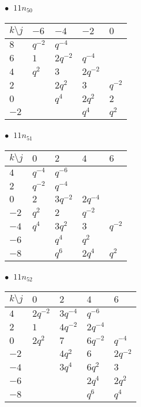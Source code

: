 %
\begin{minipage}{\linewidth}
$\bullet\ $ $11n_{50}$ \vspace{0.5em} \\
\begin{tabular}{l|llll}
$k \setminus j$ & $-6$ & $-4$ & $-2$ & $0$ \\
\hline
$8$ & $q^{-2}$ & $q^{-4}$ &  &  \\
$6$ & $1$ & $2q^{-2}$ & $q^{-4}$ &  \\
$4$ & $q^{2}$ & $3$ & $2q^{-2}$ &  \\
$2$ &  & $2q^{2}$ & $3$ & $q^{-2}$ \\
$0$ &  & $q^{4}$ & $2q^{2}$ & $2$ \\
$-2$ &  &  & $q^{4}$ & $q^{2}$ \\
\end{tabular}
\vspace{2em}
\end{minipage}
%
\begin{minipage}{\linewidth}
$\bullet\ $ $11n_{51}$ \vspace{0.5em} \\
\begin{tabular}{l|llll}
$k \setminus j$ & $0$ & $2$ & $4$ & $6$ \\
\hline
$4$ & $q^{-4}$ & $q^{-6}$ &  &  \\
$2$ & $q^{-2}$ & $q^{-4}$ &  &  \\
$0$ & $2$ & $3q^{-2}$ & $2q^{-4}$ &  \\
$-2$ & $q^{2}$ & $2$ & $q^{-2}$ &  \\
$-4$ & $q^{4}$ & $3q^{2}$ & $3$ & $q^{-2}$ \\
$-6$ &  & $q^{4}$ & $q^{2}$ &  \\
$-8$ &  & $q^{6}$ & $2q^{4}$ & $q^{2}$ \\
\end{tabular}
\vspace{2em}
\end{minipage}
%
\begin{minipage}{\linewidth}
$\bullet\ $ $11n_{52}$ \vspace{0.5em} \\
\begin{tabular}{l|llll}
$k \setminus j$ & $0$ & $2$ & $4$ & $6$ \\
\hline
$4$ & $2q^{-2}$ & $3q^{-4}$ & $q^{-6}$ &  \\
$2$ & $1$ & $4q^{-2}$ & $2q^{-4}$ &  \\
$0$ & $2q^{2}$ & $7$ & $6q^{-2}$ & $q^{-4}$ \\
$-2$ &  & $4q^{2}$ & $6$ & $2q^{-2}$ \\
$-4$ &  & $3q^{4}$ & $6q^{2}$ & $3$ \\
$-6$ &  &  & $2q^{4}$ & $2q^{2}$ \\
$-8$ &  &  & $q^{6}$ & $q^{4}$ \\
\end{tabular}
\vspace{2em}
\end{minipage}
